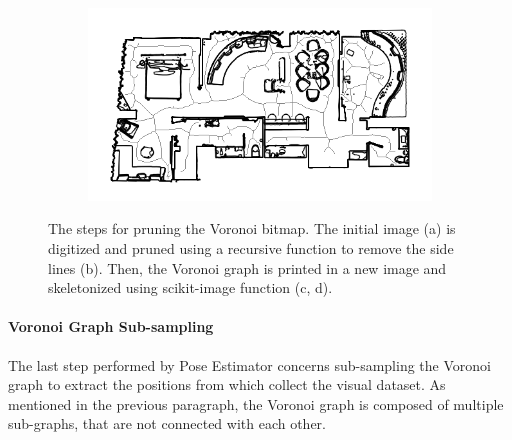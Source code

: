 \begin{figure}[h!]
\begin{subfigure}[b]{0.49\linewidth}
		\caption{}
		\label{fig:pose_estimator_skelethon}
	\end{subfigure}
	\hfil
	\begin{subfigure}[b]{0.49\linewidth}
		\centering
		\includegraphics[width=\textwidth]{images/pose_estimator_skelethon_map.png}
		\caption{}
		\label{fig:pose_estimator_skelethon_map}
	\end{subfigure}
	\caption{The steps for pruning the Voronoi bitmap. The initial image (a) is digitized and pruned using a recursive function to remove the side lines (b). Then, the Voronoi graph is printed in a new image and skeletonized using scikit-image function (c, d). }
\end{figure}

\newpage

\paragraph{Voronoi Graph Sub-sampling} The last step performed by Pose Estimator concerns sub-sampling the Voronoi graph to extract the positions from which collect the visual dataset. As mentioned in the previous paragraph, the Voronoi graph is composed of multiple sub-graphs, that are not connected with each other. 


